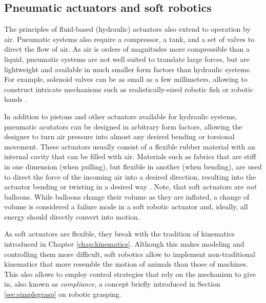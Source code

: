 \subsection{Pneumatic actuators and soft robotics}
The principles of fluid-based (hydraulic) actuators also extend to operation by air. Pneumatic systems also require a compressor, a tank, and a set of valves to direct the flow of air. As air is orders of magnitudes more compressible than a liquid, pneumatic systems are not well suited to translate large forces, but are lightweight and available in much smaller form factors than hydraulic systems. For example, solenoid valves can be as small as a few millimeters, allowing to construct intricate mechanisms such as realistically-sized robotic fish \cite{katzschmann2018exploration} or robotic hands \cite{deimel2016novel}.

In addition to pistons and other actuators available for hydraulic systems, pneumatic acutators can be designed in arbitrary form factors, allowing the designer to turn air pressure into almost any desired bending or torsional movement. These actuators usually consist of a flexible rubber material with an internal cavity that can be filled with air. Materials such as fabrics that are stiff in one dimension (when pulling), but flexible in another (when bending), are used to direct the force of the incoming air into a desired direction, resulting into the actuator bending or twisting in a desired way \cite{polygerinos2017soft}. Note, that soft actuators are \emph{not} balloons. While balloons change their volume as they are inflated, a change of volume is considered a failure mode in a soft robotic actuator and, ideally, all energy should directly convert into motion. 

As soft actuators are flexible, they break with the tradition of kinematics introduced in Chapter \ref{chap:kinematics}. Although this makes modeling and controlling them more difficult, soft robotics allow to implement non-traditional kinematics that more resemble the motion of animals than those of machines. This also allows to employ control strategies that rely on the mechanism to give in, also known as \emph{compliance}, a concept briefly introduced in Section \ref{sec:simplegrasp} on robotic grasping. 



